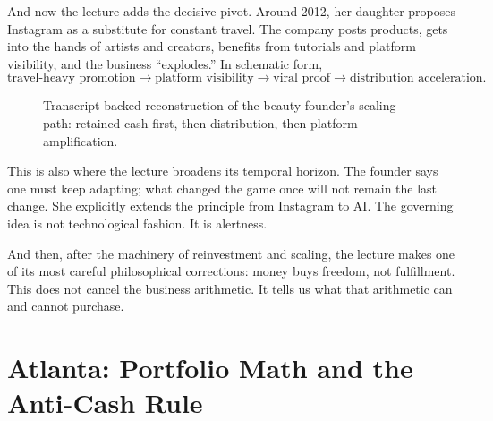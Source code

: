 And now the lecture adds the decisive pivot. Around 2012, her daughter proposes Instagram as a substitute for constant travel. The company posts products, gets into the hands of artists and creators, benefits from tutorials and platform visibility, and the business ``explodes.'' In schematic form,
\begin{equation}
\text{travel-heavy promotion} \rightarrow \text{platform visibility} \rightarrow \text{viral proof} \rightarrow \text{distribution acceleration}.
\end{equation}

\begin{figure}[h]
\centering
{}
\caption{Transcript-backed reconstruction of the beauty founder's scaling path: retained cash first, then distribution, then platform amplification.}
\end{figure}

This is also where the lecture broadens its temporal horizon. The founder says one must keep adapting; what changed the game once will not remain the last change. She explicitly extends the principle from Instagram to AI. The governing idea is not technological fashion. It is alertness.

And then, after the machinery of reinvestment and scaling, the lecture makes one of its most careful philosophical corrections: money buys freedom, not fulfillment. This does not cancel the business arithmetic. It tells us what that arithmetic can and cannot purchase.

\section{Atlanta: Portfolio Math and the Anti-Cash Rule}

